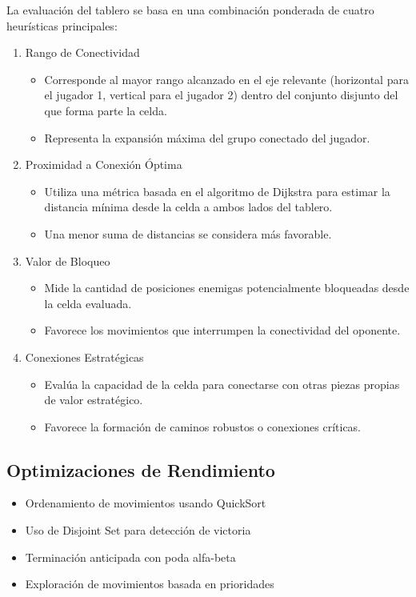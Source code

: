 \documentclass{article}
\begin{document}
La evaluación del tablero se basa en una combinación ponderada de cuatro heurísticas principales:

\begin{enumerate}
    \item Rango de Conectividad
    \begin{itemize}
        \item Corresponde al mayor rango alcanzado en el eje relevante (horizontal para el jugador 1, vertical para el jugador 2) dentro del conjunto disjunto del que forma parte la celda.
        \item Representa la expansión máxima del grupo conectado del jugador.
    \end{itemize}

    \item Proximidad a Conexión Óptima
    \begin{itemize}
        \item Utiliza una métrica basada en el algoritmo de Dijkstra para estimar la distancia mínima desde la celda a ambos lados del tablero.
        \item Una menor suma de distancias se considera más favorable.
    \end{itemize}

    \item Valor de Bloqueo
    \begin{itemize}
        \item Mide la cantidad de posiciones enemigas potencialmente bloqueadas desde la celda evaluada.
        \item Favorece los movimientos que interrumpen la conectividad del oponente.
    \end{itemize}

    \item Conexiones Estratégicas
    \begin{itemize}
        \item Evalúa la capacidad de la celda para conectarse con otras piezas propias de valor estratégico.
        \item Favorece la formación de caminos robustos o conexiones críticas.
    \end{itemize}
\end{enumerate}


\subsection{Optimizaciones de Rendimiento}
\begin{itemize}
    \item Ordenamiento de movimientos usando QuickSort
    \item Uso de Disjoint Set para detección de victoria
    \item Terminación anticipada con poda alfa-beta
    \item Exploración de movimientos basada en prioridades
\end{itemize}
\end{document}

